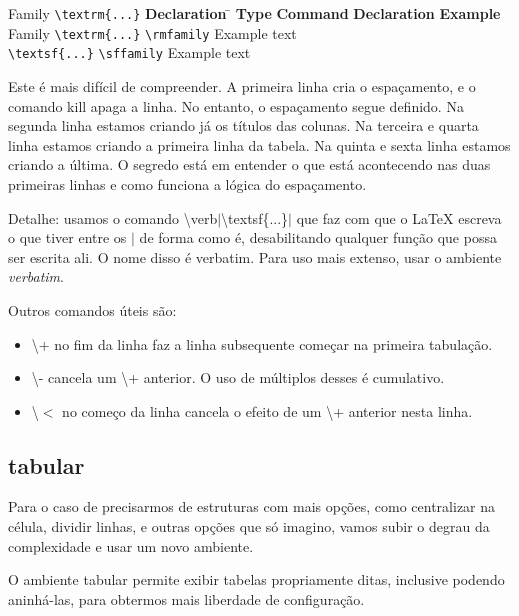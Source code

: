 \newcommand{\head}[1]{\textbf{#1}}

\begin{tabbing}
	Family \= \verb|\textrm{...}| \= \head{Declaration} \= \kill
	\head{Type}\> \head{Command} \> \head{Declaration} \> \head{Example} \\
	Family \> \verb|\textrm{...}| \> \verb|\rmfamily|
	\> \rmfamily Example text \\
	\> \verb|\textsf{...}| \> \verb|\sffamily|
	\> \sffamily Example text \\
\end{tabbing}

Este é mais difícil de compreender. A primeira linha cria o espaçamento, e o
comando kill apaga a linha. No entanto, o espaçamento segue definido. Na
segunda linha estamos criando já os títulos das colunas. Na terceira e quarta
linha estamos criando a primeira linha da tabela. Na quinta e sexta linha
estamos criando a última. O segredo está em entender o que está acontecendo nas
duas primeiras linhas e como funciona a lógica do espaçamento.

Detalhe: usamos o comando \textbackslash verb$|$\textbackslash textsf\{...\}$|$
que faz com que o LaTeX escreva o que tiver entre os $|$ de forma como é,
desabilitando qualquer função que possa ser escrita ali.
O nome disso é verbatim. Para uso mais extenso, usar o ambiente \emph{verbatim}. 


Outros comandos úteis são:
\begin{itemize}
	\item \textbackslash + no fim da linha faz a linha subsequente começar na primeira tabulação.
	\item \textbackslash - cancela um \textbackslash + anterior. O uso de múltiplos desses é cumulativo.
	\item \textbackslash $<$ no começo da linha cancela o efeito de um \textbackslash + anterior nesta linha.
\end{itemize}


\subsection{tabular}
Para o caso de precisarmos de estruturas com mais opções, como centralizar na
célula, dividir linhas, e outras opções que só imagino, vamos subir o degrau da
complexidade e usar um novo ambiente.

O ambiente tabular permite exibir tabelas propriamente ditas, inclusive podendo
aninhá-las, para obtermos mais liberdade de configuração.

